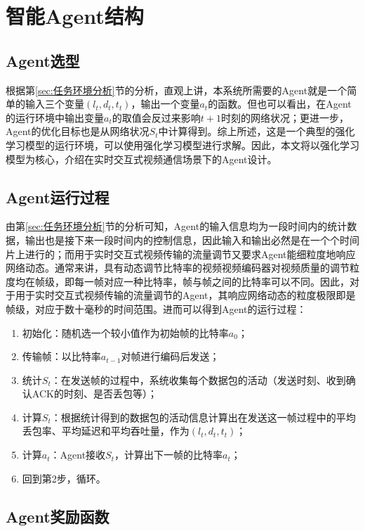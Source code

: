 \documentclass[a4paper]{ctexart}
\begin{document}
\section{智能Agent结构}

\subsection{Agent选型}

根据第\ref{sec:任务环境分析}节的分析，直观上讲，本系统所需要的Agent就是一个简单的输入三个变量$(l_t, d_t, t_t)$，输出一个变量$a_t$的函数。但也可以看出，在Agent的运行环境中输出变量$a_t$的取值会反过来影响$t+1$时刻的网络状况；更进一步，Agent的优化目标也是从网络状况$S_t$中计算得到。综上所述，这是一个典型的强化学习模型的运行环境\cite{russell2002artificial}，可以使用强化学习模型进行求解。因此，本文将以强化学习模型为核心，介绍在实时交互式视频通信场景下的Agent设计。

\subsection{Agent运行过程}

由第\ref{sec:任务环境分析}节的分析可知，Agent的输入信息均为一段时间内的统计数据，输出也是接下来一段时间内的控制信息，因此输入和输出必然是在一个个时间片上进行的；而用于实时交互式视频传输的流量调节又要求Agent能细粒度地响应网络动态。通常来讲，具有动态调节比特率的视频视频编码器对视频质量的调节粒度均在帧级，即每一帧对应一种比特率，帧与帧之间的比特率可以不同。因此，对于用于实时交互式视频传输的流量调节的Agent，其响应网络动态的粒度极限即是帧级，对应于数十毫秒的时间范围。进而可以得到Agent的运行过程：

\begin{enumerate}[label=\arabic*、]
	\item 初始化：随机选一个较小值作为初始帧的比特率$a_0$；
	\item 传输帧：以比特率$a_{t-1}$对帧进行编码后发送；
	\item 统计$S_t$：在发送帧的过程中，系统收集每个数据包的活动（发送时刻、收到确认ACK的时刻、是否丢包等）；
	\item 计算$S_t$：根据统计得到的数据包的活动信息计算出在发送这一帧过程中的平均丢包率、平均延迟和平均吞吐量，作为$(l_t, d_t, t_t)$；
	\item 计算$a_t$：Agent接收$S_t$，计算出下一帧的比特率$a_t$；
	\item 回到第2步，循环。
\end{enumerate}

\subsection{Agent奖励函数}
\end{document}
